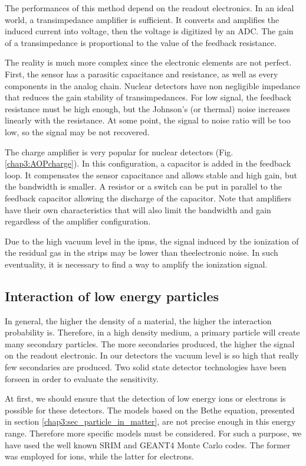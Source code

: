 \begin{refsection}
  The performances of this method depend on the readout electronics. In an ideal world, a transimpedance amplifier is sufficient. It converts and amplifies the induced current into voltage, then the voltage is digitized by an ADC. The gain of a transimpedance is proportional to the value of the feedback resistance.

  The reality is much more complex since the electronic elements are not perfect. First, the sensor has a parasitic capacitance and resistance, as well as every components in the analog chain. Nuclear detectors have non negligible impedance that reduces the gain stability of transimpedances.
  For low signal, the feedback resistance must be high enough, but the Johnson’s (or thermal) noise increases linearly with the resistance. At some point, the signal to noise ratio will be too low, so the signal may be not recovered.

  The charge amplifier is very popular for nuclear detectors (Fig. \ref{chap3:AOPcharge}). In this configuration, a capacitor is added in the feedback loop. It compensates the sensor capacitance and allows stable and high gain, but the bandwidth is smaller. A resistor or a switch can be put in parallel to the feedback capacitor allowing the discharge of the capacitor. Note that amplifiers have their own characteristics that will also limit the bandwidth and gain regardless of the amplifier configuration.

  

  Due to the high vacuum level in the \acrshort{ipm}s, the signal induced by the ionization of the residual gas in the strips may be lower than theelectronic noise. In such eventuality, it is necessary to find a way to amplify the ionization signal.

  \subsection{Interaction of low energy particles}
  \label{chap3:low_energy}
  In general, the higher the density of a material, the higher the interaction probability is. Therefore, in a high density medium, a primary particle will create many secondary particles. The more secondaries produced, the higher the signal on the readout electronic. In our detectors the vacuum level is so high that really few secondaries are produced. Two solid state detector technologies have been forseen in order to evaluate the sensitivity.

  At first, we should ensure that the detection of low energy ions or electrons is possible for these detectors. The models based on the Bethe equation, presented in section \ref{chap3:sec_particle_in_matter}, are not precise enough in this energy range. Therefore more specific models must be considered. For such a purpose, we have used the well known SRIM and GEANT4 Monte Carlo codes. The former was employed for ions, while the latter for electrons.


\end{refsection}
